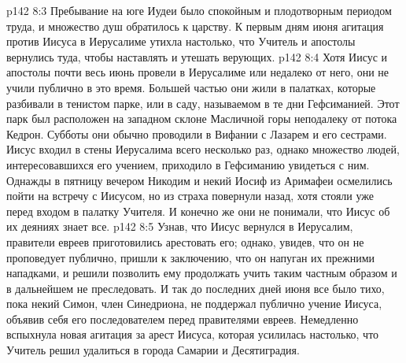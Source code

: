 \vs p142 8:3 Пребывание на юге Иудеи было спокойным и плодотворным периодом труда, и множество душ обратилось к царству. К первым дням июня агитация против Иисуса в Иерусалиме утихла настолько, что Учитель и апостолы вернулись туда, чтобы наставлять и утешать верующих.
\vs p142 8:4 Хотя Иисус и апостолы почти весь июнь провели в Иерусалиме или недалеко от него, они не учили публично в это время. Большей частью они жили в палатках, которые разбивали в тенистом парке, или в саду, называемом в те дни Гефсиманией. Этот парк был расположен на западном склоне Масличной горы неподалеку от потока Кедрон. Субботы они обычно проводили в Вифании с Лазарем и его сестрами. Иисус входил в стены Иерусалима всего несколько раз, однако множество людей, интересовавшихся его учением, приходило в Гефсиманию увидеться с ним. Однажды в пятницу вечером Никодим и некий Иосиф из Аримафеи осмелились пойти на встречу с Иисусом, но из страха повернули назад, хотя стояли уже перед входом в палатку Учителя. И конечно же они не понимали, что Иисус об их деяниях знает все.
\vs p142 8:5 Узнав, что Иисус вернулся в Иерусалим, правители евреев приготовились арестовать его; однако, увидев, что он не проповедует публично, пришли к заключению, что он напуган их прежними нападками, и решили позволить ему продолжать учить таким частным образом и в дальнейшем не преследовать. И так до последних дней июня все было тихо, пока некий Симон, член Синедриона, не поддержал публично учение Иисуса, объявив себя его последователем перед правителями евреев. Немедленно вспыхнула новая агитация за арест Иисуса, которая усилилась настолько, что Учитель решил удалиться в города Самарии и Десятиградия.
